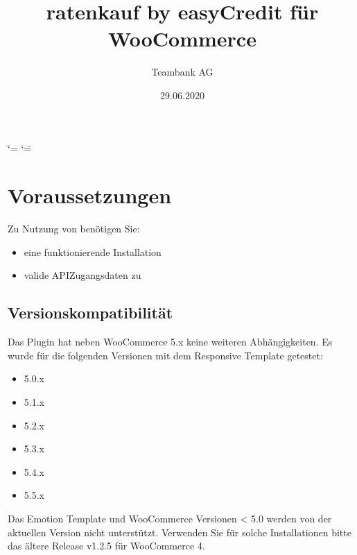 \documentclass[a4paper,10pt,openany,oneside,ngerman]{sphinxmanual}
\title{ratenkauf by easyCredit für WooCommerce}
\date{29.06.2020}
\author{Teambank AG}
\begin{document}
\ifdefined\shorthandoff
  \ifnum\catcode`\=\string=\active\shorthandoff{=}\fi
  \ifnum\catcode`\"=\active{}\fi
\fi

\pagestyle{empty}
\sphinxmaketitle
\pagestyle{plain}
\sphinxtableofcontents
\pagestyle{normal}
\label{\detokenize{index::doc}}



\chapter{Voraussetzungen}
\label{\detokenize{requirements:voraussetzungen}}\label{\detokenize{requirements::doc}}
Zu Nutzung von  benötigen Sie:
\begin{itemize}
\item {} 
eine funktionierende  Installation

\item {} 
valide API\sphinxhyphen{}Zugangsdaten zu 

\end{itemize}


\section{Versionskompatibilität}
\label{\detokenize{requirements:versionskompatibilitat}}
Das Plugin hat neben WooCommerce 5.x keine weiteren Abhängigkeiten. Es wurde für die folgenden Versionen mit dem Responsive Template getestet:
\begin{itemize}
\item {} 
5.0.x

\item {} 
5.1.x

\item {} 
5.2.x

\item {} 
5.3.x

\item {} 
5.4.x

\item {} 
5.5.x

\end{itemize}

Das Emotion Template und WooCommerce Versionen < 5.0 werden von der aktuellen Version nicht unterstützt.
Verwenden Sie für solche Installationen bitte das ältere Release v1.2.5 für WooCommerce 4.
\end{document}
